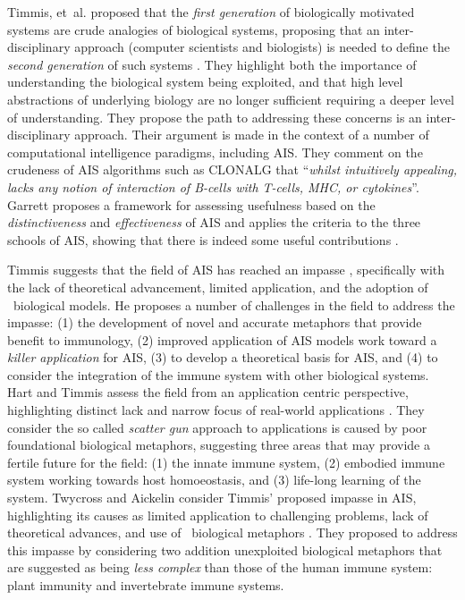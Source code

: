 Timmis, et~al. proposed that the \emph{first generation} of biologically motivated systems are crude analogies of biological systems, proposing that an inter-disciplinary approach (computer scientists and biologists) is needed to define the \emph{second generation} of such systems \cite{Timmis2005}. They highlight both the importance of understanding the biological system being exploited, and that high level abstractions of underlying biology are no longer sufficient requiring a deeper level of understanding. They propose the path to addressing these concerns is an inter-disciplinary approach. Their argument is made in the context of a number of computational intelligence paradigms, including AIS. They comment on the crudeness of AIS algorithms such as CLONALG that ``\emph{whilst intuitively appealing, lacks any notion of interaction of B-cells with T-cells, MHC, or cytokines}''.
Garrett proposes a framework for assessing usefulness based on the \emph{distinctiveness} and \emph{effectiveness} of AIS and applies the criteria to the three schools of AIS, showing that there is indeed some useful contributions \cite{Garrett2005}.

Timmis suggests that the field of AIS has reached an impasse \cite{Timmis2007}, specifically with the lack of theoretical advancement, limited application, and the adoption of \naive\ biological models. He proposes a number of challenges in the field to address the impasse: (1) the development of novel and accurate metaphors that provide benefit to immunology, (2) improved application of AIS models work toward a \emph{killer application} for AIS, (3) to develop a theoretical basis for AIS, and (4) to consider the integration of the immune system with other biological systems. 
Hart and Timmis assess the field from an application centric perspective, highlighting distinct lack and narrow focus of real-world applications \cite{Hart2005}. They consider the so called \emph{scatter gun} approach to applications is caused by poor foundational biological metaphors, suggesting three areas that may provide a fertile future for the field: (1) the innate immune system, (2) embodied immune system  working towards host homoeostasis, and (3) life-long learning of the system.
Twycross and Aickelin consider Timmis' proposed impasse in AIS, highlighting its causes as limited application to challenging problems, lack of theoretical advances, and use of \naive\ biological metaphors  \cite{Twycross2007}. They proposed to address this impasse by considering two addition unexploited biological metaphors that are suggested as being \emph{less complex} than those of the human immune system: plant immunity and invertebrate immune systems.



